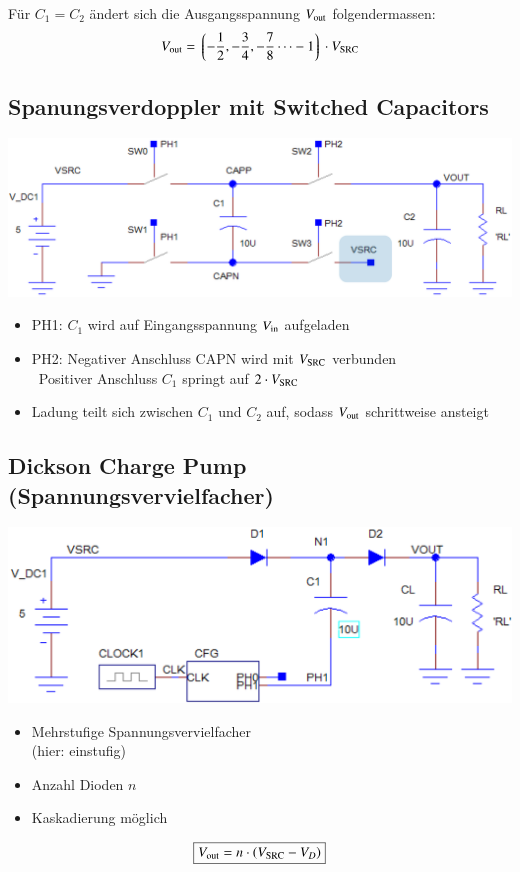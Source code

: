 Für  $C_1 = C_2$ ändert sich die Ausgangsspannung $V_{\rm out}$ folgendermassen:
$$ V_{\rm out} = \left\lgroup - \frac{1}{2}, - \frac{3}{4}, - \frac{7}{8} \cdots -1\right\rgroup \cdot V_{\rm SRC} $$


\subsection{Spanungsverdoppler mit Switched Capacitors}

\begin{center}
    \includegraphics[width=0.75\columnwidth]{images/spannungsverdoppler.png}
\end{center}

\begin{itemize}
    \item PH1: $C_1$ wird auf Eingangsspannung $V_{\rm in}$ aufgeladen
    \item PH2: Negativer Anschluss CAPN wird mit $V_{\rm SRC}$ verbunden\\
    \textrightarrow\ Positiver Anschluss $C_1$ springt auf $2 \cdot V_{\rm SRC} $
    \item Ladung teilt sich zwischen $C_1$ und $C_2$ auf, sodass $V_{\rm out}$ schrittweise ansteigt 
\end{itemize}


\subsection{Dickson Charge Pump (Spannungsvervielfacher)}

\begin{minipage}[c]{0.5\columnwidth}
    \includegraphics[width=\columnwidth]{images/dickson_charge_pump.png}
\end{minipage}
\hfill
\begin{minipage}[c]{0.48\columnwidth}
    \begin{itemize}
        \item Mehrstufige Spannungsvervielfacher\\
            (hier: einstufig)
        \item Anzahl Dioden $n$ 
        \item Kaskadierung möglich
    \end{itemize}
    $$ \boxed{ V_{\rm out} = n \cdot (V_{\rm SRC} - V_D) } $$
\end{minipage}


